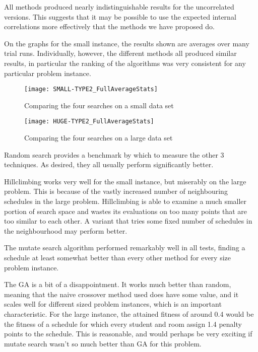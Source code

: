 \documentclass[letterpaper]{article}
\begin{document}
    All methods produced nearly indistinguishable results for the uncorrelated 
    versions. This suggests that it may be possible to use the expected internal 
    correlations more effectively that the methods we have proposed do.
    
    On the graphs for the small instance, the results shown are averages over many trial 
    runs. Individually, however, the different methods all produced similar results, in 
    particular the ranking of the algorithms was very consistent for any particular problem 
    instance.
    
    \begin{figure}[h]
  	  \centering
  	  \texttt{[image: SMALL-TYPE2\_FullAverageStats]}
      \caption{Comparing the four searches on a small data set}
	\end{figure}
	
	\begin{figure}[h]
  	  \centering
  	  \texttt{[image: HUGE-TYPE2\_FullAverageStats]}
      \caption{Comparing the four searches on a large data set}
	\end{figure}
	
	Random search provides a benchmark by which to measure the other 3 techniques. 
	As desired, they all usually perform significantly better.
	
	Hillclimbing works very well for the small instance, but miserably on the large 
	problem. This is because of the vastly increased number of neighbouring schedules 
	in the large problem. Hillclimbing is able to examine a much smaller portion of 
	search space and wastes its evaluations on too many points that are too similar 
	to each other. A variant that tries some fixed number of schedules in the 
	neighbourhood may perform better.
	
	The mutate search algorithm performed remarkably well in all tests, finding a 
	schedule at least somewhat better than every other method for every size problem 
	instance.
	
	The GA is a bit of a disappointment. It works much better than random, meaning 
	that the naive crossover method used does have some value, and it scales well 
	for different sized problem instances, which is an important characteristic. 
	For the large instance, the attained fitness of around 0.4 would be the fitness 
	of a schedule for which every student and room assign 1.4 penalty points to the 
	schedule. This is reasonable, and would perhaps be very exciting if mutate search 
	wasn't so much better than GA for this problem.
  
\end{document}
